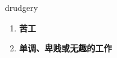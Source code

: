 
\begin{frame}
{\huge drudgery}
\begin{center}
\begin{enumerate}\Large
  \item \textbf{苦工}
  \item \textbf{单调、卑贱或无趣的工作}
\end{enumerate}
\end{center}
\end{frame}
